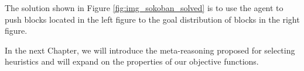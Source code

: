 The solution shown in Figure \ref{fig:img_sokoban_solved} is to use the agent to push blocks located in the left figure to the goal distribution of blocks in the right figure.\\

\bigskip

In the next Chapter, we will introduce the meta-reasoning proposed for selecting heuristics and will expand on the properties of our objective functions.\\

\clearpage